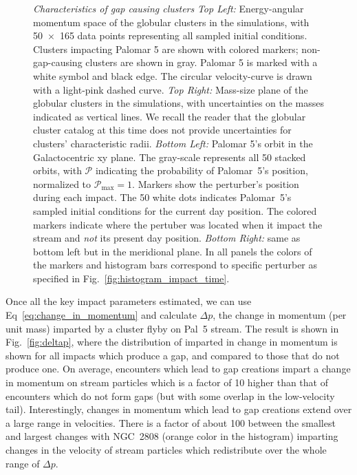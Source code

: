 \documentclass{aa}
\begin{document}
\begin{figure}
      \caption{\textit{Characteristics of gap causing clusters} \textit{Top Left:} Energy-angular momentum space of the globular clusters in the simulations, with 50~$\times$~165 data points representing all sampled initial conditions. Clusters impacting Palomar 5 are shown with colored markers; non-gap-causing clusters are shown in gray. Palomar 5 is marked with a white symbol and black edge. The circular velocity-curve is drawn with a light-pink dashed curve. \textit{Top Right:} Mass-size plane of the globular clusters in the simulations, with uncertainties on the masses indicated as vertical lines. We recall the reader that the globular cluster catalog at this time does not provide uncertainties for clusters' characteristic radii. \textit{Bottom Left:} Palomar 5's orbit in the Galactocentric xy plane. The gray-scale represents all 50 stacked orbits, with $\mathcal{P}$ indicating the probability of  Palomar~5's position, normalized to $\mathcal{P}_\textrm{max}=1$. Markers show the perturber's position during each impact. The 50 white dots indicates Palomar~5's sampled initial conditions for the current day position. The colored markers indicate where the pertuber was located when it impact the stream and \textit{not} its present day position. \textit{Bottom Right:} same as bottom left but in the meridional plane. In all panels the colors of the markers and histogram bars correspond to specific perturber as specified in Fig.~\ref{fig:histogram_impact_time}.}
      \label{fig:mass_size_plane}
    \end{figure}

      
    Once all the key impact parameters estimated, we can use Eq~\ref{eq:change_in_momentum} and calculate $\Delta p$, the change in momentum (per unit mass) imparted by a cluster flyby on Pal~5 stream. The result  is shown in Fig.~\ref{fig:deltap}, where the distribution of imparted in change in momentum is shown for all impacts which produce a gap, and compared to those that do not produce one. On average, encounters which lead to gap creations impart a change in momentum on stream particles which is a factor of 10 higher than that of encounters which do not form gaps (but with some overlap in the low-velocity tail). Interestingly, changes in momentum which lead to gap creations extend over a large range in velocities. There is a factor of about 100 between the smallest and largest changes with NGC~2808 (orange color in the histogram) imparting changes in the velocity of stream particles which redistribute over the whole range of $\Delta p$. 
\end{document}
